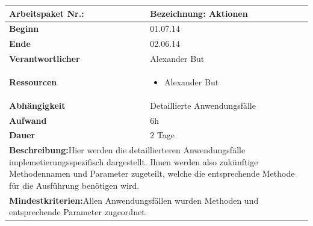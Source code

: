 \documentclass[fontsize=12pt,paper=a4,twoside]{scrartcl}
\begin{document}
	\begin{verbatim} 
	\end{verbatim}
	
	\begin{tabular}{|p{5.3cm}|p{9.7cm}|}\hline
		\textbf{Arbeitspaket Nr.:}  & \textbf{Bezeichnung:} Aktionen\\ \hline \hline
		\textbf{Beginn} & 01.07.14\\ \hline
		\textbf{Ende} & 02.06.14\\ \hline
		\textbf{Verantwortlicher} & Alexander But\\ \hline
		\textbf{Ressourcen} & \begin{itemize}
			\item Alexander But
		\end{itemize}    \\ \hline
		\textbf{Abhängigkeit} & Detaillierte Anwendungsfälle\\ \hline
		\textbf{Aufwand} & 6h\\ \hline
		\textbf{Dauer} & 2 Tage\\ \hline
		\multicolumn{2}{|p{15cm}|}{\textbf{Beschreibung:}\newline Hier werden die detaillierteren Anwendungsfälle implemetierungsspezifisch dargestellt. Ihnen werden also zukünftige Methodennamen und Parameter zugeteilt, welche die entsprechende Methode für die Ausführung benötigen wird.  }\\ \hline
		\multicolumn{2}{|p{15cm}|}{\textbf{Mindestkriterien:}\newline  Allen Anwendungsfällen wurden Methoden und entsprechende Parameter zugeordnet. }\\ \hline
	\end{tabular}
	
	\begin{verbatim} 
	\end{verbatim}
	
\end{document}
